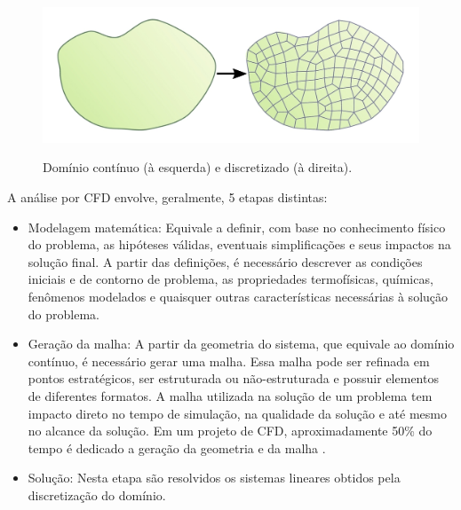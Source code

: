 \begin{figure}[htb]
  \caption[Domínio contínuo e discretizado.]{Domínio contínuo (à esquerda) e discretizado (à direita).}
  \centering\includegraphics[scale=1.3]{figuras/dom.png}
  \label{fig:dom}
\end{figure}

A análise por CFD envolve, geralmente, 5 etapas distintas:

\begin{itemize}
\item Modelagem matemática: Equivale a definir, com base no conhecimento
  físico do problema, as hipóteses válidas, eventuais simplificações e
  seus impactos na solução final. A partir das definições, é necessário
  descrever as condições iniciais e de contorno de problema, as propriedades
  termofísicas, químicas, fenômenos modelados e quaisquer outras características
  necessárias à solução do problema.
\item Geração da malha: A partir da geometria do sistema, que equivale ao
  domínio contínuo, é necessário gerar uma malha. Essa malha pode ser refinada
  em pontos estratégicos, ser estruturada ou não-estruturada e possuir elementos
  de diferentes formatos. A malha utilizada na solução de um problema tem impacto
  direto no tempo de simulação, na qualidade da solução e até mesmo no alcance
  da solução. Em um projeto de CFD, aproximadamente 50\% do tempo é dedicado a geração
  da geometria e da malha \cite{Versteeg2007}.
\item Solução: Nesta etapa são resolvidos os sistemas lineares obtidos pela
  discretização do domínio.
\end{itemize}



